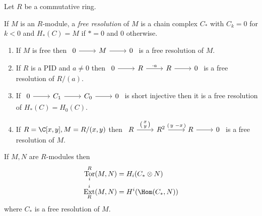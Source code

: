 \documentclass[a4paper]{article}
\DeclareMathOperator{\Tor}{Tor} %
\DeclareMathOperator{\Ext}{Ext} %
\begin{document}
Let \(R\) be a commutative ring.

\begin{definition}
  If \(M\) is an \(R\)-module, a \emph{free resolution} of \(M\) is a chain complex \(C_*\) with \(C_k = 0\) for \(k < 0\) and \(H_*(C) = M\) if \(* = 0\) and \(0\) otherwise.
\end{definition}

\begin{eg}\leavevmode
  \begin{enumerate}
  \item If \(M\) is free then \(
    \begin{tikzcd}
      0 \ar[r] & M \ar[r] & 0
    \end{tikzcd}
    \) is a free resolution of \(M\).
  \item If \(R\) is a PID and \(a \neq 0\) then \(
    \begin{tikzcd}
      0 \ar[r] & R \ar[r, "\cdot a"] & R \ar[r] & 0
    \end{tikzcd}
    \) is a free resolution of \(R/(a)\).
  \item If \(
    \begin{tikzcd}
      0 \ar[r] & C_1 \ar[r] & C_0 \ar[r] & 0
    \end{tikzcd}
    \) is short injective then it is a free resolution of \(H_*(C) = H_0(C)\).
  \item If \(R = \C[x, y], M = R/(x, y)\) then \(
    \begin{tikzcd}[ampersand replacement=\&]
      R \ar[r, "{\begin{psmallmatrix} x \\ y \end{psmallmatrix}}"]
      \& R^2 \ar[r, "{\begin{psmallmatrix} y & -x \end{psmallmatrix}}"] \& R \ar[r] \& 0
    \end{tikzcd}
    \) is a free resolution of \(M\).
  \end{enumerate}
\end{eg}

\begin{definition}[\(\Tor\) and \(\Ext\)]
  If \(M, N\) are \(R\)-modules then
  \begin{align*}
    \Tor_i^R(M, N) &= H_i(C_* \otimes N) \\
    \Ext_R^i(M, N) &= H^i(\Hom(C_*, N))
  \end{align*}
  where \(C_*\) is a free resolution of \(M\).
\end{definition}
\end{document}
